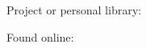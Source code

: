 \documentclass{article}
\begin{document}
Project or personal library:

Found online:


\end{document}
